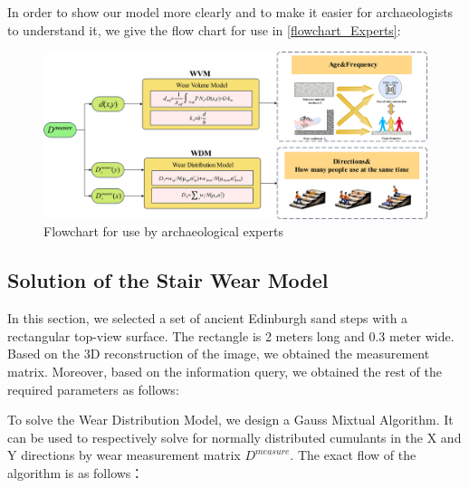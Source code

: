 \documentclass[12pt]{article}  %
\numberwithin{equation}{section} %
\begin{document}
In order to show our model more clearly and to make it easier for archaeologists to understand it, we give the flow chart for use in \autoref{flowchart_Experts}:
\begin{figure}[H]
	\centering
	\includegraphics[width=\linewidth]{美赛Latex模板/模型流程图1.jpg}
	\caption{Flowchart for use by archaeological experts}
	\label{flowchart_Experts}
\end{figure}

\subsection{Solution of the Stair Wear Model}
In this section, we selected a set of ancient Edinburgh sand steps with a rectangular top-view surface. The rectangle is 2 meters long and 0.3 meter wide. Based on the 3D reconstruction of the image, we obtained the measurement matrix. Moreover, based on the information query, we obtained the rest of the required parameters as follows:

To solve the Wear Distribution Model, we design a Gauss Mixtual Algorithm. It can be used to respectively solve for normally distributed cumulants in the X and Y directions by wear measurement matrix $D^{measure}$. The exact flow of the algorithm is as follows：
\end{document}
